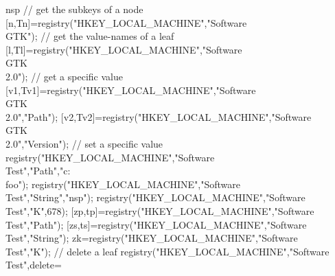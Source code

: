 \begin{examples}
  \begin{mintednsp}{nsp} 
    // get the subkeys of a node 
    [n,Tn]=registry("HKEY_LOCAL_MACHINE","Software\\GTK");
    // get the value-names of a leaf 
    [l,Tl]=registry("HKEY_LOCAL_MACHINE","Software\\GTK\\2.0");
    // get a specific value 
    [v1,Tv1]=registry("HKEY_LOCAL_MACHINE","Software\\GTK\\2.0","Path");
    [v2,Tv2]=registry("HKEY_LOCAL_MACHINE","Software\\GTK\\2.0","Version");
    // set a specific value 
    registry("HKEY_LOCAL_MACHINE","Software\\Test","Path","c:\\foo");
    registry("HKEY_LOCAL_MACHINE","Software\\Test","String","nsp");
    registry("HKEY_LOCAL_MACHINE","Software\\Test","K",678);
    [zp,tp]=registry("HKEY_LOCAL_MACHINE","Software\\Test","Path");
    [zs,ts]=registry("HKEY_LOCAL_MACHINE","Software\\Test","String");
    zk=registry("HKEY_LOCAL_MACHINE","Software\\Test","K");
    // delete a leaf 
    registry("HKEY_LOCAL_MACHINE","Software\\Test",delete=%
  \end{mintednsp}
\end{examples}


